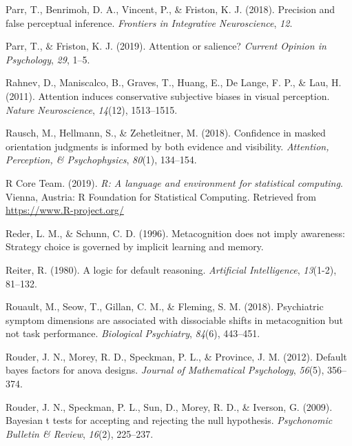 \documentclass[12pt,twoside]{reedthesis}
\begin{document}
\leavevmode\hypertarget{ref-parr2018precision}{}%
Parr, T., Benrimoh, D. A., Vincent, P., \& Friston, K. J. (2018). Precision and false perceptual inference. \emph{Frontiers in Integrative Neuroscience}, \emph{12}.

\leavevmode\hypertarget{ref-parr2019attention}{}%
Parr, T., \& Friston, K. J. (2019). Attention or salience? \emph{Current Opinion in Psychology}, \emph{29}, 1--5.

\leavevmode\hypertarget{ref-rahnev2011attention}{}%
Rahnev, D., Maniscalco, B., Graves, T., Huang, E., De Lange, F. P., \& Lau, H. (2011). Attention induces conservative subjective biases in visual perception. \emph{Nature Neuroscience}, \emph{14}(12), 1513--1515.

\leavevmode\hypertarget{ref-rausch2018confidence}{}%
Rausch, M., Hellmann, S., \& Zehetleitner, M. (2018). Confidence in masked orientation judgments is informed by both evidence and visibility. \emph{Attention, Perception, \& Psychophysics}, \emph{80}(1), 134--154.

\leavevmode\hypertarget{ref-R-base}{}%
R Core Team. (2019). \emph{R: A language and environment for statistical computing}. Vienna, Austria: R Foundation for Statistical Computing. Retrieved from \url{https://www.R-project.org/}

\leavevmode\hypertarget{ref-reder1996metacognition}{}%
Reder, L. M., \& Schunn, C. D. (1996). Metacognition does not imply awareness: Strategy choice is governed by implicit learning and memory.

\leavevmode\hypertarget{ref-reiter1980logic}{}%
Reiter, R. (1980). A logic for default reasoning. \emph{Artificial Intelligence}, \emph{13}(1-2), 81--132.

\leavevmode\hypertarget{ref-rouault2018psychiatric}{}%
Rouault, M., Seow, T., Gillan, C. M., \& Fleming, S. M. (2018). Psychiatric symptom dimensions are associated with dissociable shifts in metacognition but not task performance. \emph{Biological Psychiatry}, \emph{84}(6), 443--451.

\leavevmode\hypertarget{ref-rouder2012default}{}%
Rouder, J. N., Morey, R. D., Speckman, P. L., \& Province, J. M. (2012). Default bayes factors for anova designs. \emph{Journal of Mathematical Psychology}, \emph{56}(5), 356--374.

\leavevmode\hypertarget{ref-rouder2009bayesian}{}%
Rouder, J. N., Speckman, P. L., Sun, D., Morey, R. D., \& Iverson, G. (2009). Bayesian t tests for accepting and rejecting the null hypothesis. \emph{Psychonomic Bulletin \& Review}, \emph{16}(2), 225--237.
\end{document}
